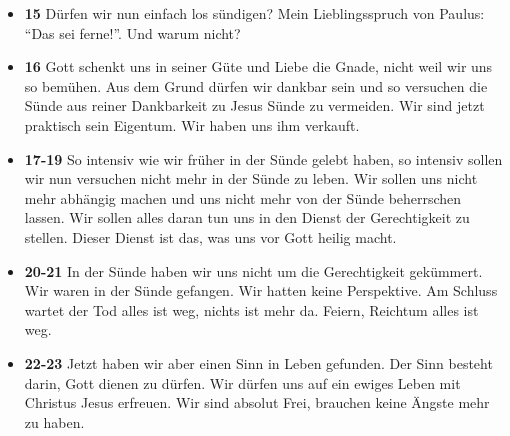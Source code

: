 \begin{itemize}
    \item \textbf{15} Dürfen wir nun einfach los sündigen? Mein Lieblingsspruch von Paulus: \enquote{Das sei ferne!}. Und warum nicht?
    \item \textbf{16} Gott schenkt uns in seiner Güte und Liebe die Gnade, nicht weil wir uns so bemühen. Aus dem Grund dürfen wir dankbar sein und so versuchen die Sünde aus reiner Dankbarkeit zu Jesus Sünde zu vermeiden. Wir sind jetzt praktisch sein Eigentum. Wir haben uns ihm verkauft.
    \item \textbf{17-19} So intensiv wie wir früher in der Sünde gelebt haben, so intensiv sollen wir nun versuchen nicht mehr in der Sünde zu leben. Wir sollen uns nicht mehr abhängig machen und uns nicht mehr von der Sünde beherrschen lassen. Wir sollen alles daran tun uns in den Dienst der Gerechtigkeit zu stellen. Dieser Dienst ist das, was uns vor Gott heilig macht.
    \item \textbf{20-21} In der Sünde haben wir uns nicht um die Gerechtigkeit gekümmert. Wir waren in der Sünde gefangen. Wir hatten keine Perspektive. Am Schluss wartet der Tod alles ist weg, nichts ist mehr da. Feiern, Reichtum alles ist weg.
    \item  \textbf{22-23} Jetzt haben wir aber einen Sinn in Leben gefunden. Der Sinn besteht darin, Gott dienen zu dürfen. Wir dürfen uns auf ein ewiges Leben mit Christus Jesus erfreuen. Wir sind absolut Frei, brauchen keine Ängste mehr zu haben.
\end{itemize}

